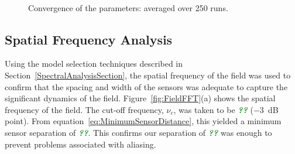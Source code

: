 \documentclass[12pt]{iopart}
\newcommand{\omg}[1]{\textsf{\emph{\textbf{\textcolor{green}{#1}}}}}
\begin{document}
\begin{figure}[th]
\\
\caption{Convergence of the parameters: averaged over 250 runs.}
\label{fig:ParametersConvergence}
\end{figure}

\subsection{Spatial Frequency Analysis} 
Using the model selection techniques described in Section~\ref{SpectralAnalysisSection}, the spatial frequency of the field was used to confirm that the spacing and width of the sensors was adequate to capture the significant dynamics of the field. Figure~\ref{fig:FieldFFT}(a) shows the spatial frequency of the field. The cut-off frequency, $\nu_c$, was taken to be \omg{??} ($-3$~dB point). From equation~\ref{eq:MinimumSensorDistance}, this yielded a minimum sensor separation of \omg{??}. This confirms our separation of \omg{??} was enough to prevent problems associated with aliasing.
\end{document}
